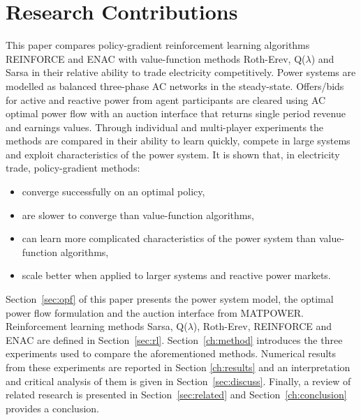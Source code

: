 \section{Research Contributions}
%
This paper compares policy-gradient reinforcement learning algorithms
REINFORCE and ENAC with value-function methods Roth-Erev, Q($\lambda$) and
Sarsa in their relative ability to trade electricity competitively.  Power
systems are modelled as balanced three-phase AC networks in the steady-state.
Offers/bids for active and reactive power from agent participants are cleared
using AC optimal power flow with an auction interface that returns single
period revenue and earnings values. Through individual and multi-player
experiments the methods are compared in their ability to learn quickly, compete
in large systems and exploit characteristics of the power system. It is shown
that, in electricity trade, policy-gradient methods:
\begin{itemize}
  \item converge successfully on an optimal policy,
  \item are slower to converge than value-function algorithms,
  \item can learn more complicated characteristics of the power system than
  value-function algorithms,
  \item scale better when applied to larger systems and reactive power markets.
\end{itemize}
Section~\ref{sec:opf} of this paper presents the power system model, the
optimal power flow formulation and the auction interface from MATPOWER.
Reinforcement learning methods Sarsa, Q($\lambda$), Roth-Erev, REINFORCE and
ENAC are defined in Section~\ref{sec:rl}. Section~\ref{ch:method} introduces
the three experiments used to compare the aforementioned methods. Numerical
results from these experiments are reported in Section \ref{ch:results} and
an interpretation and critical analysis of them is given in
Section~\ref{sec:discuss}.  Finally, a review of related research is presented
in Section~\ref{sec:related} and Section~\ref{ch:conclusion} provides a
conclusion.


